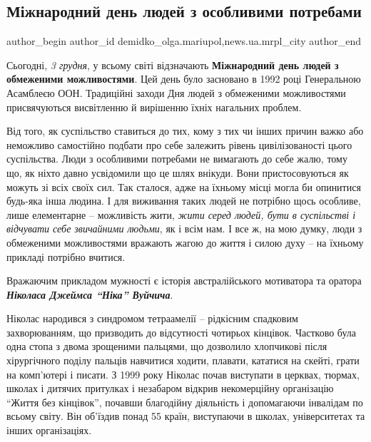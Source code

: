  
 
 
 
 
 
\subsection{Міжнародний день людей з особливими потребами}
\label{sec:03_12_2020.stz.news.ua.mrpl_city.1.mizhn_den_ljudej_osobl_potreb}
 
\ifcmt
 author_begin
   author_id demidko_olga.mariupol,news.ua.mrpl_city
 author_end
\fi

Сьогодні, \emph{3 грудня}, у всьому світі відзначають \textbf{Міжнародний день людей з
обмеженими можливостями}. Цей день було засновано в 1992 році Генеральною
Асамблеєю ООН. Традиційні заходи Дня людей з обмеженими можливостями
присвячуються висвітленню й вирішенню їхніх нагальних проблем.

Від того, як суспільство ставиться до тих, кому з тих чи інших причин важко або
неможливо самостійно подбати про себе залежить рівень цивілізованості цього
суспільства. Люди з особливими потребами не вимагають до себе жалю, тому що, як
ніхто давно усвідомили що це шлях внікуди. Вони пристосовуються як можуть зі
всіх своїх сил. Так сталося, адже на їхньому місці могла би опинитися будь-яка
інша людина. І для виживання таких людей не потрібно щось особливе, лише
елементарне – можливість жити, \emph{жити серед людей, бути в суспільстві і відчувати
себе звичайними людьми}, як і всім нам. І все ж, на мою думку, люди з обмеженими
можливостями вражають жагою до життя і силою духу – на їхньому прикладі
потрібно вчитися.

Вражаючим прикладом мужності є історія австралійського мотиватора та оратора
\emph{\textbf{Ніколаса Джеймса \enquote{Ніка} Вуйчича}}.


Ніколас народився з синдромом тетраамелії – рідкісним спадковим захворюванням,
що призводить до відсутності чотирьох кінцівок. Частково була одна стопа з
двома зрощеними пальцями, що дозволило хлопчикові після хірургічного поділу
пальців навчитися ходити, плавати, кататися на скейті, грати на комп'ютері і
писати. З 1999 року Ніколас почав виступати в церквах, тюрмах, школах і дитячих
притулках і незабаром відкрив некомерційну організацію \enquote{Життя без кінцівок},
почавши благодійну діяльність і допомагаючи інвалідам по всьому світу. Він
об'їздив понад 55 країн, виступаючи в школах, університетах та інших
організаціях.

